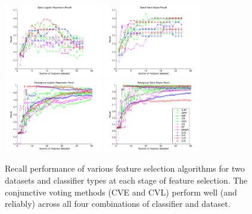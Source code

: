 \begin{figure}[tbp!]
\centering
\includegraphics[width=0.38\textwidth]{./figures/linegraphs/SpectLogisticRegressionRecall.pdf}
\includegraphics[width=0.38\textwidth]{./figures/linegraphs/SpectNaiveBayesRecall.pdf}\\
\includegraphics[width=0.38\textwidth]{./figures/linegraphs/NewsgroupLogisticRegressionRecall.pdf}
\includegraphics[width=0.38\textwidth]{./figures/linegraphs/NewsgroupNaiveBayesRecall.pdf}
\caption{\footnotesize Recall performance of various feature selection algorithms for two datasets and classifier types at each stage of feature selection.  The conjunctive voting methods (CVE and CVL)
perform well (and reliably) across all four combinations of classifier and dataset.}
\label{fig:perf_vs_fs_alg}
\end{figure}

